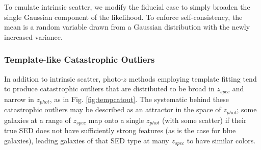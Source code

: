 \documentclass[iop]{emulateapj}
\begin{document}
To emulate intrinsic scatter, we modify the fiducial case to simply broaden the single Gaussian component of the likelihood.  To enforce self-consistency, the mean is a random variable drawn from a Gaussian distribution with the newly increased variance.

\subsubsection{Template-like Catastrophic Outliers}
\label{sec:tempcatout}

In addition to intrinsic scatter, photo-$z$ methods employing template fitting tend to produce catastrophic outliers that are distributed to be broad in $z_{spec}$ and narrow in $z_{phot}$, as in Fig. \ref{fig:tempcatout}.  The systematic behind these catastrophic outliers may be described as an attractor in the space of $z_{phot}$; some galaxies at a range of $z_{spec}$ map onto a single $z_{phot}$ (with some scatter) if their true SED does not have sufficiently strong features (as is the case for blue galaxies), leading galaxies of that SED type at many $z_{spec}$ to have similar colors.
\end{document}

